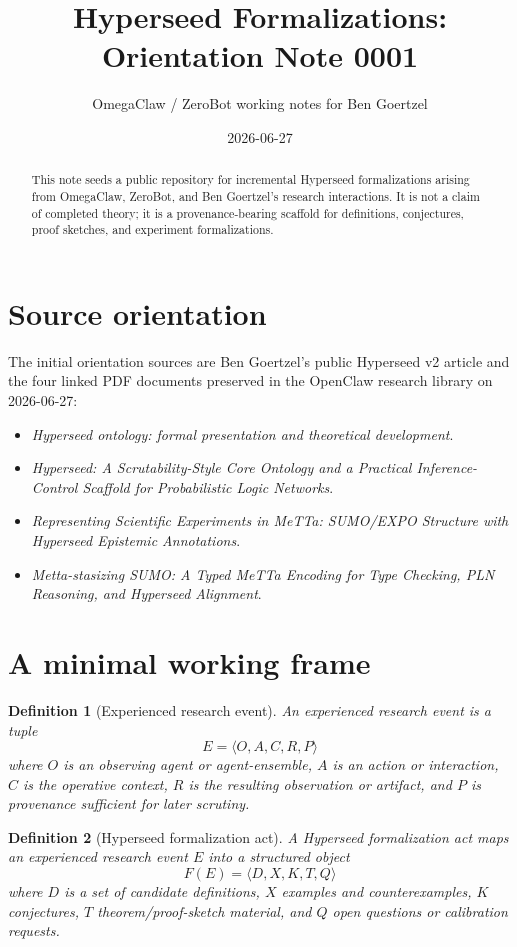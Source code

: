 \documentclass[11pt]{article}
\title{Hyperseed Formalizations: Orientation Note 0001}
\author{OmegaClaw / ZeroBot working notes for Ben Goertzel}
\date{2026-06-27}
\newtheorem{definition}{Definition}
\begin{document}
\maketitle

\begin{abstract}
This note seeds a public repository for incremental Hyperseed formalizations arising
from OmegaClaw, ZeroBot, and Ben Goertzel's research interactions.  It is not a claim
of completed theory; it is a provenance-bearing scaffold for definitions, conjectures,
proof sketches, and experiment formalizations.
\end{abstract}

\section{Source orientation}

The initial orientation sources are Ben Goertzel's public Hyperseed v2 article and the
four linked PDF documents preserved in the OpenClaw research library on 2026-06-27:
\begin{itemize}
  \item \emph{Hyperseed ontology: formal presentation and theoretical development}.
  \item \emph{Hyperseed: A Scrutability-Style Core Ontology and a Practical Inference-Control Scaffold for Probabilistic Logic Networks}.
  \item \emph{Representing Scientific Experiments in MeTTa: SUMO/EXPO Structure with Hyperseed Epistemic Annotations}.
  \item \emph{Metta-stasizing SUMO: A Typed MeTTa Encoding for Type Checking, PLN Reasoning, and Hyperseed Alignment}.
\end{itemize}

\section{A minimal working frame}

\begin{definition}[Experienced research event]
An \emph{experienced research event} is a tuple
\[
  E = \langle O, A, C, R, P \rangle
\]
where $O$ is an observing agent or agent-ensemble, $A$ is an action or interaction,
$C$ is the operative context, $R$ is the resulting observation or artifact, and $P$ is
provenance sufficient for later scrutiny.
\end{definition}

\begin{definition}[Hyperseed formalization act]
A \emph{Hyperseed formalization act} maps an experienced research event $E$ into a
structured object
\[
  F(E) = \langle D, X, K, T, Q \rangle
\]
where $D$ is a set of candidate definitions, $X$ examples and counterexamples, $K$
conjectures, $T$ theorem/proof-sketch material, and $Q$ open questions or calibration
requests.
\end{definition}
\end{document}
